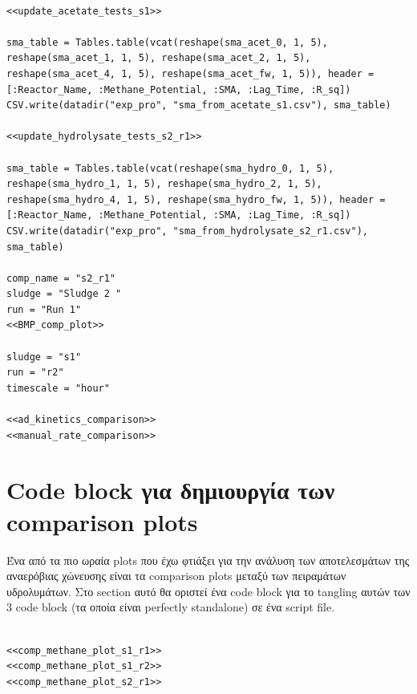 \documentclass[11pt]{article}
\begin{document}
\begin{verbatim}

<<update_acetate_tests_s1>>

sma_table = Tables.table(vcat(reshape(sma_acet_0, 1, 5), reshape(sma_acet_1, 1, 5), reshape(sma_acet_2, 1, 5), reshape(sma_acet_4, 1, 5), reshape(sma_acet_fw, 1, 5)), header = [:Reactor_Name, :Methane_Potential, :SMA, :Lag_Time, :R_sq])
CSV.write(datadir("exp_pro", "sma_from_acetate_s1.csv"), sma_table)

<<update_hydrolysate_tests_s2_r1>>

sma_table = Tables.table(vcat(reshape(sma_hydro_0, 1, 5), reshape(sma_hydro_1, 1, 5), reshape(sma_hydro_2, 1, 5), reshape(sma_hydro_4, 1, 5), reshape(sma_hydro_fw, 1, 5)), header = [:Reactor_Name, :Methane_Potential, :SMA, :Lag_Time, :R_sq])
CSV.write(datadir("exp_pro", "sma_from_hydrolysate_s2_r1.csv"), sma_table)

comp_name = "s2_r1"
sludge = "Sludge 2 "
run = "Run 1"
<<BMP_comp_plot>>

sludge = "s1"
run = "r2"
timescale = "hour"

<<ad_kinetics_comparison>>
<<manual_rate_comparison>>
\end{verbatim}

\section{Code block για δημιουργία των comparison plots}
\label{sec:orgbd66b02}
Ένα από τα πιο ωραία plots που έχω φτιάξει για την ανάλυση των αποτελεσμάτων της αναερόβιας χώνευσης είναι τα comparison plots μεταξύ των πειραμάτων υδρολυμάτων. Στο section αυτό θα οριστεί ένα code block για το tangling αυτών των 3 code block (τα οποία είναι perfectly standalone) σε ένα script file.

\begin{verbatim}

<<comp_methane_plot_s1_r1>>
<<comp_methane_plot_s1_r2>>
<<comp_methane_plot_s2_r1>>

\end{verbatim}
\end{document}
